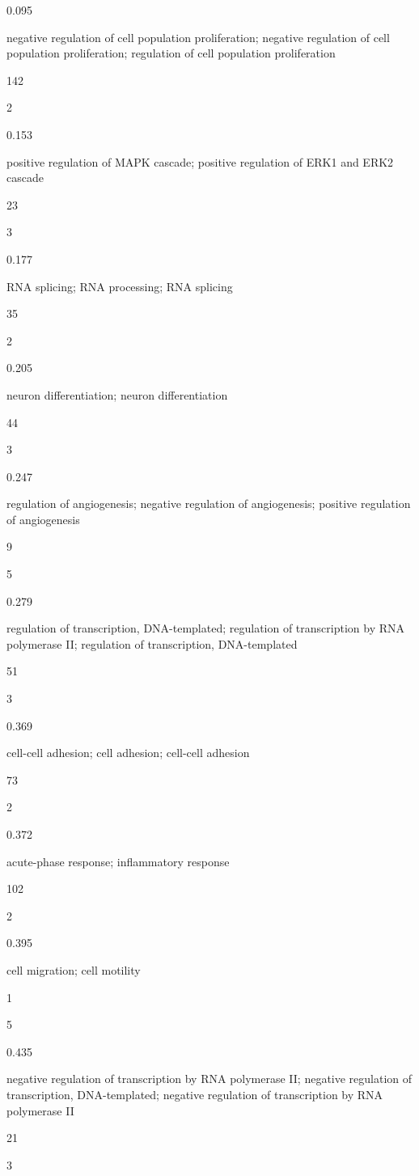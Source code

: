 \documentclass[
  letterpaper,
  DIV=11,
  numbers=noendperiod,
  openany,
  oneside]{scrreprt}
\begin{document}
0.095

negative regulation of cell population proliferation; negative
regulation of cell population proliferation; regulation of cell
population proliferation

142

2

0.153

positive regulation of MAPK cascade; positive regulation of ERK1 and
ERK2 cascade

23

3

0.177

RNA splicing; RNA processing; RNA splicing

35

2

0.205

neuron differentiation; neuron differentiation

44

3

0.247

regulation of angiogenesis; negative regulation of angiogenesis;
positive regulation of angiogenesis

9

5

0.279

regulation of transcription, DNA-templated; regulation of transcription
by RNA polymerase II; regulation of transcription, DNA-templated

51

3

0.369

cell-cell adhesion; cell adhesion; cell-cell adhesion

73

2

0.372

acute-phase response; inflammatory response

102

2

0.395

cell migration; cell motility

1

5

0.435

negative regulation of transcription by RNA polymerase II; negative
regulation of transcription, DNA-templated; negative regulation of
transcription by RNA polymerase II

21

3
\end{document}
